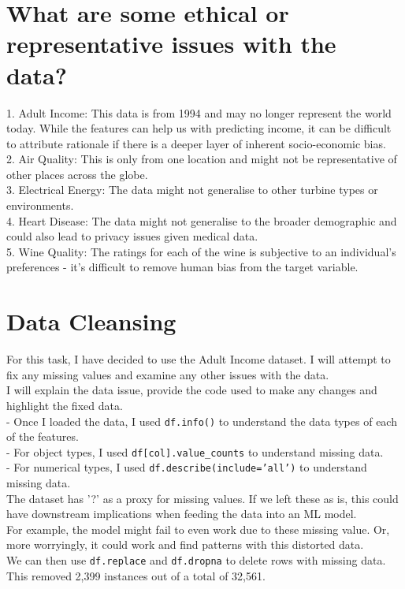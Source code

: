 \documentclass[11pt]{article}
\begin{document}
\section{What are some ethical or representative issues with the data?}
1. Adult Income: This data is from 1994 and may no longer represent the world today. While the features can help us with predicting income, it can be difficult to attribute rationale if there is a deeper layer of inherent socio-economic bias. \\
2. Air Quality: This is only from one location and might not be representative of other places across the globe. \\
3. Electrical Energy: The data might not generalise to other turbine types or environments. \\
4. Heart Disease: The data might not generalise to the broader demographic and could also lead to privacy issues given medical data. \\
5. Wine Quality: The ratings for each of the wine is subjective to an individual's preferences - it's difficult to remove human bias from the target variable.

\section{Data Cleansing}
For this task, I have decided to use the Adult Income dataset. I will attempt to fix any missing values and examine any other issues with the data. \\
I will explain the data issue, provide the code used to make any changes and highlight the fixed data. \\
- Once I loaded the data, I used \texttt{df.info()} to understand the data types of each of the features. \\
- For object types, I used \texttt{df[col].value\_counts} to understand missing data. \\
- For numerical types, I used \texttt{df.describe(include='all')} to understand missing data. \\
The dataset has '?' as a proxy for missing values. If we left these as is, this could have downstream implications when feeding the data into an ML model. \\
For example, the model might fail to even work due to these missing value. Or, more worryingly, it could work and find patterns with this distorted data. \\
We can then use \texttt{df.replace} and \texttt{df.dropna} to delete rows with missing data. This removed 2,399 instances out of a total of 32,561. 
\end{document}
